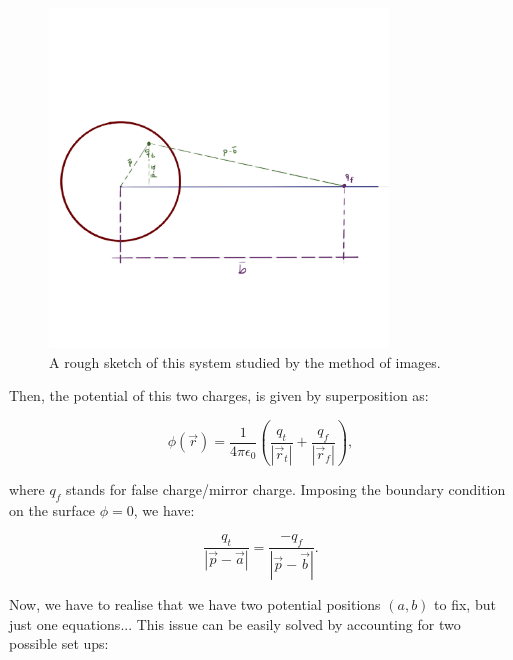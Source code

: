 \begin{figure}[h!]
	\includegraphics[width=9cm]{figures/MirrorCharge.png}
	\centering
	\caption{A rough sketch of this system studied by the method of images.}
	\label{fig:Charge}
\end{figure}

Then, the potential of this two charges, is given by superposition as:

\begin{equation}
	\phi (\vec{r}) = \frac{1}{4\pi \epsilon_{0}}\left(\frac{q_{t}}{\left|\vec{r}_{t}\right|} + \frac{q_{f}}{\left|\vec{r}_{f}\right|}\right),
\end{equation}

where $q_{f}$ stands for false charge/mirror charge. Imposing the boundary condition on the surface $\phi =0$, we have:

\begin{equation}
	\frac{q_{t}}{\left|\vec{p}-\vec{a}\right|} = \frac{-q_{f}}{\left|\vec{p}-\vec{b}\right|}.
\end{equation}

Now, we have to realise that we have two potential positions $(a,b)$ to fix, but just one equations... This issue can be easily solved by accounting for two possible set ups:

